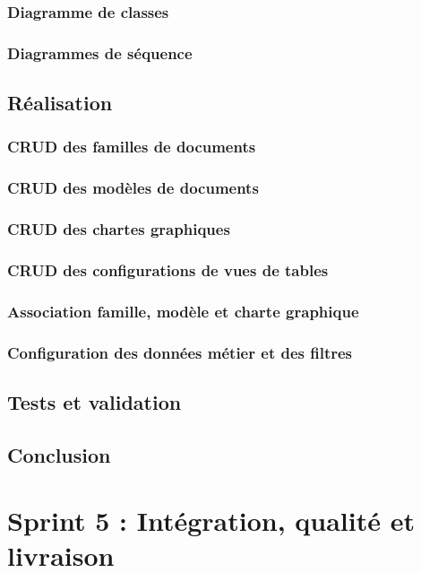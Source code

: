 \documentclass[12pt,a4paper]{report}
\begin{document}
\subsection{Diagramme de classes}
\subsection{Diagrammes de séquence}
\section{Réalisation}
\subsection{CRUD des familles de documents}
\subsection{CRUD des modèles de documents}
\subsection{CRUD des chartes graphiques}
\subsection{CRUD des configurations de vues de tables}
\subsection{Association famille, modèle et charte graphique}
\subsection{Configuration des données métier et des filtres}
\section{Tests et validation}
\section{Conclusion}


\chapter{Sprint 5 : Intégration, qualité et livraison}
\end{document}
